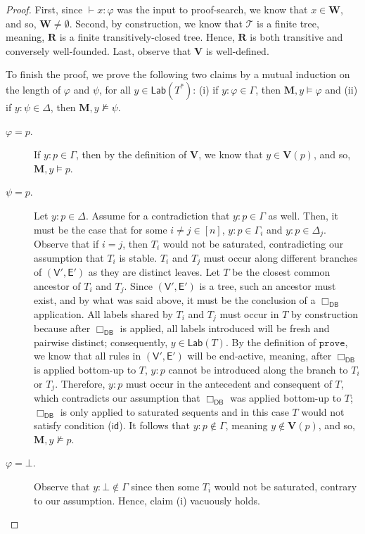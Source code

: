 \documentclass[10pt,a4paper]{amsart}
\newcommand{\M}{\mathbf{M}}
\newcommand{\R}{\mathbf{R}}
\newcommand{\V}{\mathbf{V}}
\newcommand{\W}{\mathbf{W}}
\newcommand{\cte}{\mathsf{E}}
\newcommand{\ctv}{\mathsf{V}}
\newcommand{\id}{\mathsf{id}}
\newcommand{\lab}{\mathsf{Lab}}
\newcommand{\ndrule}{\Box_\mathsf{DB}}
\renewcommand{\phi}{\varphi}
\newcommand{\prove}{\mathtt{prove}}
\newcommand{\sar}{\vdash}
\newcommand{\tel}{\mathcal{T}}
\newcommand{\tseq}{T} %
\begin{document}
\begin{proof}
First, since $\sar x : \phi$ was the input to proof-search, we know that $x \in \W$, and so, $\W \neq \emptyset$. Second, by construction, we know that $\tel$ is a finite tree, meaning, $\R$ is a finite transitively-closed tree. Hence, $\R$ is both transitive and conversely well-founded. Last, observe that $\V$ is well-defined. 

To finish the proof, we prove the following two claims by a mutual induction on the length of $\phi$ and $\psi$, for all $y \in \lab(\tseq^{*})$: (i) if $y : \phi \in \Gamma$, then $\M, y \models \phi$ and (ii) if $y : \psi \in \Delta$, then $\M, y \not\models \psi$.
\begin{description}

\item[$\phi = p.$] If $y : p \in \Gamma$, then by the definition of $\V$, we know that $y \in \V(p)$, and so, $\M, y \models p$.

\item[$\psi = p.$] Let $y : p \in \Delta$. Assume for a contradiction that $y : p \in \Gamma$ as well. Then, it must be the case that for some $i \neq j \in [n]$, $y : p \in \Gamma_{i}$ and $y : p \in \Delta_{j}$. Observe that if $i = j$, then $\tseq_{i}$ would not be saturated, contradicting our assumption that $\tseq_{i}$ is stable. $\tseq_{i}$ and $\tseq_{j}$ must occur along different branches of $(\ctv',\cte')$ as they are distinct leaves. Let $\tseq$ be the closest common ancestor of $\tseq_{i}$ and $\tseq_{j}$. Since $(\ctv',\cte')$ is a tree, such an ancestor must exist, and by what was said above, it must be the conclusion of a $\ndrule$ application. All labels shared by $\tseq_{i}$ and $\tseq_{j}$ must occur in $\tseq$ by construction because after $\ndrule$ is applied, all labels introduced will be fresh and pairwise distinct; consequently, $y \in \lab(\tseq)$. By the definition of $\prove$, we know that all rules in $(\ctv',\cte')$ will be end-active, meaning, after $\ndrule$ is applied bottom-up to $\tseq$, $y : p$ cannot be introduced along the branch to $\tseq_{i}$ or $\tseq_{j}$. Therefore, $y : p$ must occur in the antecedent and consequent of $\tseq$, which contradicts our assumption that $\ndrule$ was applied bottom-up to $\tseq$; $\ndrule$ is only applied to saturated sequents and in this case $\tseq$ would not satisfy condition ($\id$). It follows that $y : p \not\in \Gamma$, meaning $y \not\in \V(p)$, and so, $\M, y \not\models p$.

\item[$\phi = \bot.$] Observe that $y : \bot \not\in \Gamma$ since then some $\tseq_{i}$ would not be saturated, contrary to our assumption. Hence, claim (i) vacuously holds.


\end{description}
\end{proof}
\end{document}
